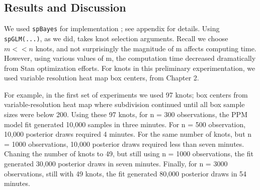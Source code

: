 
\subsection{Results and Discussion}

We used \verb|spBayes| for implementation \citep{Finley2013}; see appendix for details. Using \verb|spGLM(...)|, as we did, takes knot selection arguments. Recall we choose $m < < n$ knots, and not surprisingly the magnitude of m affects computing time. However, using various values of m, the computation time decreased dramatically from Stan optimization efforts. For knots in this preliminary experimentation, we used variable resolution heat map box centers, from Chapter 2.

For example, in the first set of experiments we used 97 knots; box centers from variable-resolution heat map where subdivision continued until all box sample sizes were below 200. Using these 97 knots, for n = 300 observations, the PPM model fit generated 10,000 samples in three minutes. For n = 500 observation, 10,000 posterior draws required 4 minutes. For the same number of knots, but n = 1000 observations, 10,000 posterior draws required less than seven minutes. Chaning the number of knots to 49, but still using n = 1000 observations, the fit generated 30,000 posterior draws in seven minutes. Finally, for n = 3000 observations, still with 49 knots, the fit generated 80,000 posterior draws in 54 minutes.


